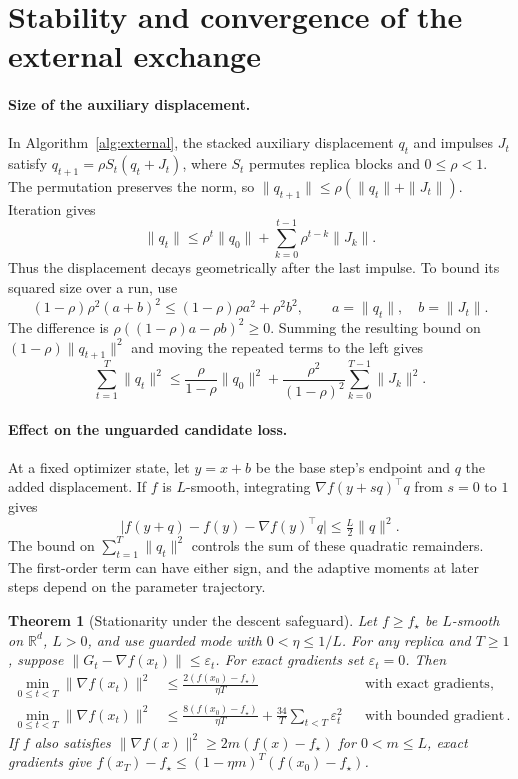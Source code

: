 \documentclass[10pt,letterpaper]{article}
\newtheorem{theorem}{Theorem}
\begin{document}
\clearpage
\section{Stability and convergence of the external exchange}
\label{app:adam}

\paragraph{Size of the auxiliary displacement.}
In Algorithm~\ref{alg:external}, the stacked auxiliary displacement \(q_t\) and impulses \(J_t\) satisfy \(q_{t+1}=\rho S_t(q_t+J_t)\), where \(S_t\) permutes replica blocks and \(0\le\rho<1\). The permutation preserves the norm, so \(\|q_{t+1}\|\le\rho(\|q_t\|+\|J_t\|)\). Iteration gives
\[
\|q_t\|\le \rho^t\|q_0\|+\sum_{k=0}^{t-1}\rho^{t-k}\|J_k\| .
\]
Thus the displacement decays geometrically after the last impulse. To bound its squared size over a run, use
\[
(1-\rho)\rho^2(a+b)^2\le (1-\rho)\rho a^2+\rho^2 b^2,
\qquad a=\|q_t\|,\quad b=\|J_t\| .
\]
The difference is \(\rho((1-\rho)a-\rho b)^2\ge0\). Summing the resulting bound on \((1-\rho)\|q_{t+1}\|^2\) and moving the repeated terms to the left gives
\[
\sum_{t=1}^{T}\|q_t\|^2\le
\frac{\rho}{1-\rho}\|q_0\|^2+
\frac{\rho^2}{(1-\rho)^2}\sum_{k=0}^{T-1}\|J_k\|^2.
\]

\paragraph{Effect on the unguarded candidate loss.}
At a fixed optimizer state, let \(y=x+b\) be the base step's endpoint and \(q\) the added displacement. If \(f\) is \(L\)-smooth, integrating \(\nabla f(y+s q)^\top q\) from \(s=0\) to \(1\) gives
\[
\big|f(y+q)-f(y)-\nabla f(y)^\top q\big|\le \tfrac L2\|q\|^2 .
\]
The bound on \(\sum_{t=1}^{T}\|q_t\|^2\) controls the sum of these quadratic remainders. The first-order term can have either sign, and the adaptive moments at later steps depend on the parameter trajectory.

\begin{theorem}[Stationarity under the descent safeguard]\label{thm:adam-guard}
Let \(f\ge f_\star\) be \(L\)-smooth on \(\mathbb R^d\), \(L>0\), and use guarded mode with \(0<\eta\le1/L\). For any replica and \(T\ge1\), suppose \(\|G_t-\nabla f(x_t)\|\le\varepsilon_t\). For exact gradients set \(\varepsilon_t=0\). Then
\[
\begin{aligned}
\min_{0\le t<T}\|\nabla f(x_t)\|^2
 &\le \frac{2(f(x_0)-f_\star)}{\eta T}
 &&\text{with exact gradients},\\
\min_{0\le t<T}\|\nabla f(x_t)\|^2
 &\le \frac{8(f(x_0)-f_\star)}{\eta T}
      +\frac{34}{T}\sum_{t<T}\varepsilon_t^2
 &&\text{with bounded gradient error}.
\end{aligned}
\]
If \(f\) also satisfies \(\|\nabla f(x)\|^2\ge2m(f(x)-f_\star)\) for \(0<m\le L\), exact gradients give \(f(x_T)-f_\star\le(1-\eta m)^T(f(x_0)-f_\star)\).
\end{theorem}
\end{document}

